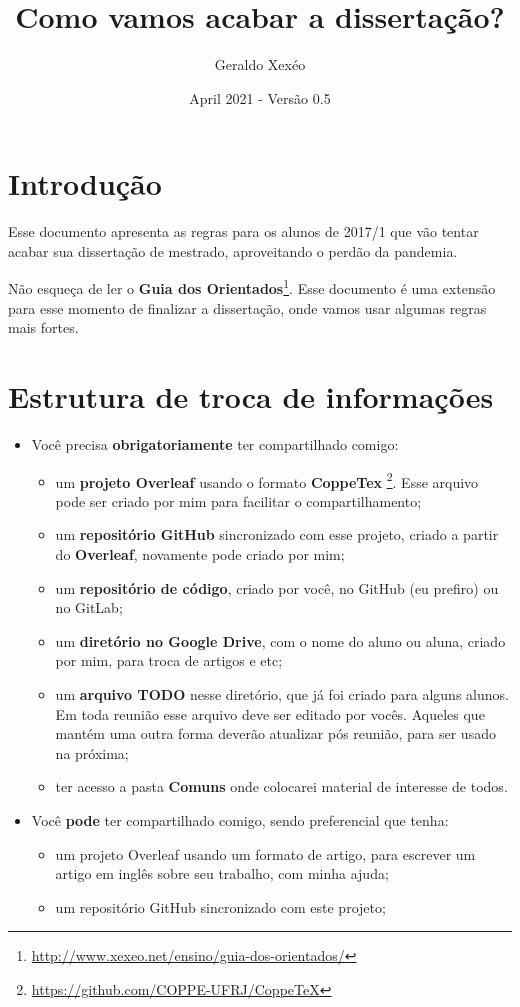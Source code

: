 \documentclass{article}
\title{Como vamos acabar a dissertação?}
\author{Geraldo Xexéo}
\date{April 2021 - Versão 0.5}
\begin{document}
\maketitle

\section{Introdução}

Esse documento apresenta as regras para os alunos de 2017/1 que vão tentar acabar sua dissertação de mestrado, aproveitando o perdão da pandemia.

Não esqueça de ler o \textbf{Guia dos Orientados}\footnote{\url{http://www.xexeo.net/ensino/guia-dos-orientados/}}. Esse documento é uma extensão para esse momento de finalizar a dissertação, onde vamos usar algumas regras mais fortes.

\section{Estrutura de troca de informações}

\begin{itemize}
    \item Você precisa \textbf{obrigatoriamente} ter compartilhado comigo:
    \begin{itemize}
        \item um \textbf{projeto Overleaf} usando o formato \textbf{CoppeTex} \footnote{\url{https://github.com/COPPE-UFRJ/CoppeTeX}}. Esse arquivo pode ser criado por mim para facilitar o compartilhamento;
        \item um \textbf{repositório GitHub} sincronizado com esse projeto, criado a partir do \textbf{Overleaf}, novamente pode criado por mim;
        \item um \textbf{repositório de código}, criado por você, no GitHub (eu prefiro) ou no GitLab;
        \item um \textbf{diretório no Google Drive}, com o nome do aluno ou aluna, criado por mim, para troca de artigos e etc;
        \item um \textbf{arquivo TODO} nesse diretório, que já foi criado para alguns alunos. Em toda reunião esse arquivo deve ser editado por vocês. Aqueles que mantém uma outra forma deverão atualizar pós reunião, para ser usado na próxima;
        \item ter acesso a pasta \textbf{Comuns} onde colocarei material de interesse de todos.
    \end{itemize}
    \item Você \textbf{pode} ter compartilhado comigo, sendo preferencial que tenha:
    \begin{itemize}
        \item um projeto Overleaf usando um formato de artigo, para escrever um artigo em inglês sobre seu trabalho, com minha ajuda;
        \item um repositório GitHub sincronizado com este projeto;
    \end{itemize}
\end{itemize}
\end{document}
